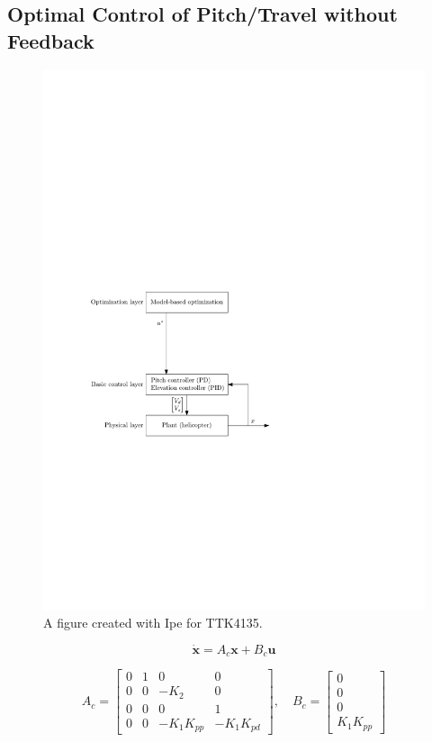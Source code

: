 \documentclass[11pt, a4paper, USenglish]{article} %
\renewcommand{\vec}[1]{\mathbf{#1}}
\begin{document}
\subsection{Optimal Control of Pitch/Travel without Feedback}
\begin{figure}[H]
    \centering
    \includegraphics[width=1.00\textwidth]{figures/layers_openloop.pdf}
    \caption{A figure created with Ipe for TTK4135.}
\label{fig:layers_openloop}
\end{figure}

\begin{equation}
    \vec{\dot{x}} = A_c\vec{x} + B_c \vec{u} 
\end{equation}

\begin{equation*}
A_c =
    \begin{bmatrix}
        0 &  1 &  0 & 0 \\
        0 &  0 &  -K_2 & 0  \\
        0 &  0 &  0 & 1 \\
        0 &  0 & -K_1K_{pp} & -K_1K_{pd}                                 
    \end{bmatrix}
    , \quad B_c = 
    \begin{bmatrix} 0 \\ 0 \\ 0 \\ K_1K_{pp} \end{bmatrix}
\end{equation*}
\end{document}
